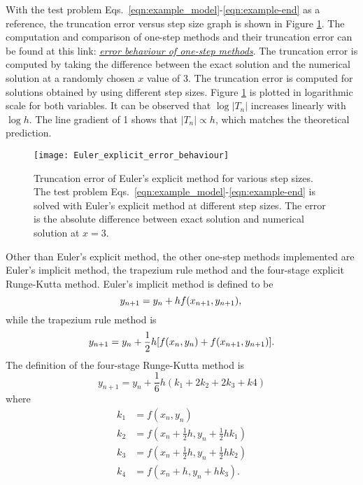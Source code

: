 With the test problem Eqs.~\eqref{eqn:example_model}-\eqref{eqn:example-end} as a reference, the truncation error versus step size graph is shown in Figure \ref{fig:Euler_explicit_error_behaviour}. The computation and comparison of one-step methods and their truncation error can be found at this link: \href{https://nbviewer.jupyter.org/github/FarmHJ/numerical-solver/blob/main/examples/Onestep_methods_convergence.ipynb}{\underline{\emph{error behaviour of one-step methods}}}. The truncation error is computed by taking the difference between the exact solution and the numerical solution at a randomly chosen $x$ value of 3. The truncation error is computed for solutions obtained by using different step sizes. Figure \ref{fig:Euler_explicit_error_behaviour} is plotted in logarithmic scale for both variables. It can be observed that $\log |T_n|$ increases linearly with $\log h$. The line gradient of 1 shows that $|T_n| \propto h$, which matches the theoretical prediction. 

\begin{figure}
    \texttt{[image: Euler\_explicit\_error\_behaviour]}
    \caption{Truncation error of Euler's explicit method for various step sizes. The test problem Eqs.~\eqref{eqn:example_model}-\eqref{eqn:example-end} is solved with Euler's explicit method at different step sizes. The error is the absolute difference between exact solution and numerical solution at $x=3$.}
    \label{fig:Euler_explicit_error_behaviour}
\end{figure}

Other than Euler's explicit method, the other one-step methods implemented are Euler's implicit method, the trapezium rule method and the four-stage explicit Runge-Kutta method. Euler's implicit method is defined to be
\begin{equation}
    y_{n+1} = y_n + hf(x_{n+1},y_{n+1}),\\
\end{equation}
while the trapezium rule method is
\begin{equation}
    y_{n+1} = y_n + \frac{1}{2}h[f(x_n,y_n) + f(x_{n+1},y_{n+1})].\\
\end{equation}
The definition of the four-stage Runge-Kutta method is
\begin{equation}
    y_{n+1} = y_n + \frac{1}{6}h(k_1 + 2k_2 + 2k_3 + k4)
\end{equation}
where
\begin{align}
    k_1 &= f(x_n, y_n) \\
    k_2 &= f(x_n + \frac{1}{2}h, y_n + \frac{1}{2}hk_1) \\
    k_3 &= f(x_n + \frac{1}{2}h, y_n + \frac{1}{2}hk_2) \\
    k_4 &= f(x_n + h, y_n + hk_3).
\end{align}

